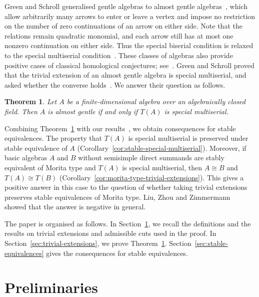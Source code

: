 \documentclass[11pt]{article}
\newtheorem{theorem}{Theorem}[section]
\theoremstyle{definition}
\begin{document}
	Green and Schroll generalised gentle algebras to almost gentle algebras~\cite{GreenSchrollAlmost}, which allow arbitrarily many arrows to enter or leave a vertex and impose no restriction on the number of zero continuations of an arrow on either side.
	Note that the relations remain quadratic monomial, and each arrow still has at most one nonzero continuation on either side.
	Thus the special biserial condition is relaxed to the special multiserial condition~\cite{vonHohneWaschbusch,GreenSchrollMultiserial}.
	These classes of algebras also provide positive cases of classical homological conjectures; see~\cite{Sch19,WHL25,CX26}.
	Green and Schroll proved that the trivial extension of an almost gentle algebra is special multiserial, and asked whether the converse holds~\cite[Corollary~4.4 and Question~4.5]{GreenSchrollAlmost}.
	We answer their question as follows.

	\begin{theorem}
		\label{main:trivial-extension}
		\label{thm:almost-gentle-trivial-special-multiserial}
		Let $A$ be a finite-dimensional algebra over an algebraically closed field.
		Then $A$ is almost gentle if and only if $T(A)$ is special multiserial.
	\end{theorem}

	Combining Theorem~\ref{main:trivial-extension} with our results~\cite{CX26}, we obtain consequences for stable equivalences.
	The property that $T(A)$ is special multiserial is preserved under stable equivalence of $A$ (Corollary~\ref{cor:stable-special-multiserial}).
	Moreover, if basic algebras $A$ and $B$ without semisimple direct summands are stably equivalent of Morita type and $T(A)$ is special multiserial, then $A\cong B$ and $T(A)\cong T(B)$ (Corollary~\ref{cor:morita-type-trivial-extensions}).
	This gives a positive answer in this case to the question of whether taking trivial extensions preserves stable equivalences of Morita type.
	Liu, Zhou and Zimmermann~\cite{LZZ17} showed that the answer is negative in general.

	The paper is organised as follows.
	In Section~\ref{sec:preliminaries}, we recall the definitions and the results on trivial extensions and admissible cuts used in the proof.
	In Section~\ref{sec:trivial-extensions}, we prove Theorem~\ref{main:trivial-extension}.
	Section~\ref{sec:stable-equivalences} gives the consequences for stable equivalences.



\section{Preliminaries}
\label{sec:preliminaries}
\end{document}
